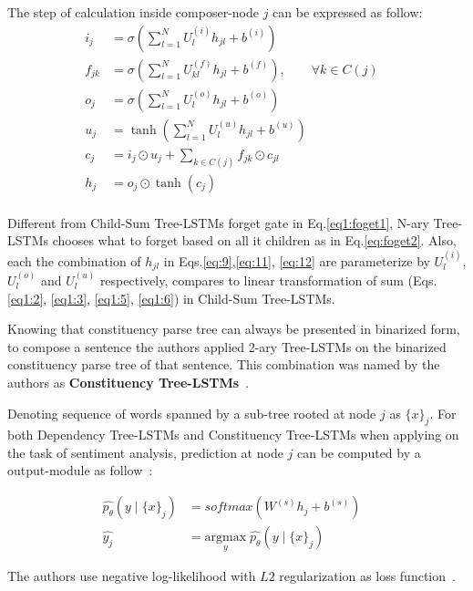The step of calculation inside composer-node \(j\) can be expressed as follow:
\begin{align}
  	i_j &= \sigma{ \left(\sum_{l=1}^{N}U_l^{(i)} h_{jl} + b^{(i)} \right) } &\label{eq:9}\\
  	f_{jk} &= \sigma{\left(\sum_{l=1}^{N}U_{kl}^{\left(f\right)} h_{jl} + b^{\left(f\right)}\right)}, \qquad  \forall k \in C(j) & \label{eq:foget2}\\ 
  	o_j &= \sigma{\left( \sum_{l=1}^{N}U_l^{\left(o\right)} h_{jl} + b^{\left(o\right)}\right)} &\label{eq:11}\\
  	u_j &= \tanh{\left( \sum_{l=1}^{N}U_l^{\left(u\right)} h_{jl} + b^{\left(u\right)}\right)} &\label{eq:12}\\
   	c_j &= i_j \odot u_j + \sum_{k \in C\left(j\right)} f_{jk} \odot c_{jl} & \\
	h_j &= o_j \odot \tanh{\left(c_j\right)} & \\
\end{align}

Different from Child-Sum Tree-LSTMs forget gate in Eq.\eqref{eq1:foget1}, N-ary Tree-LSTMs chooses what to forget based on all it children as in Eq.\eqref{eq:foget2}. 
Also, each the combination of \(h_{jl}\) in Eqs.\eqref{eq:9},\eqref{eq:11}, \eqref{eq:12} are parameterize by \(U_l^{(i)}\), \(U_l^{(o)}\) and \(U_l^{(u)}\) respectively, compares to linear transformation of sum (Eqs.\eqref{eq1:2}, \eqref{eq1:3}, \eqref{eq1:5}, \eqref{eq1:6}) in Child-Sum Tree-LSTMs.

Knowing that constituency parse tree can always be presented in binarized form, to compose a sentence the authors applied 2-ary Tree-LSTMs on the binarized constituency parse tree of that sentence. 
This combination was named by the authors as \textbf{Constituency Tree-LSTMs}~\cite{treeLSTM}.

Denoting sequence of words spanned by a sub-tree rooted at node \(j\) as \(\{x\}_j\). 
For both Dependency Tree-LSTMs and Constituency Tree-LSTMs when applying on the task of sentiment analysis, prediction at node \(j\) can be computed by a output-module as follow~\cite{treeLSTM}:

\begin{align}
  	\hat{p_{\theta}}(y \mid \{x\}_j ) &= softmax( W^{(s)} h_j + b^{(s)}) & \\
  	\hat{y_j} &= \underset{y}{\mathrm{argmax}} \; \hat{p_{\theta}}(y \mid \{x\}_j ) &
\end{align}

The authors use negative log-likelihood with \(L2\) regularization as loss function~\cite{treeLSTM}.

